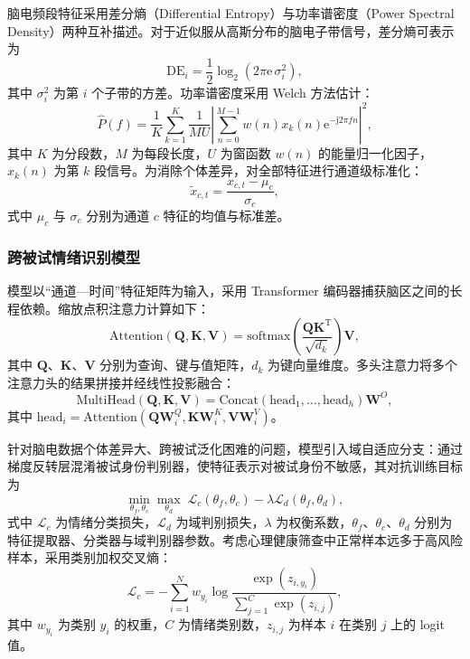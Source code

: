 \documentclass[zihao=-4,fontset=windows,a4paper]{ctexart}
\begin{document}
脑电频段特征采用差分熵（Differential Entropy）与功率谱密度（Power Spectral Density）两种互补描述。对于近似服从高斯分布的脑电子带信号，差分熵可表示为
\begin{equation}
\mathrm{DE}_i = \frac{1}{2}\log_2\left(2\pi \mathrm{e}\, \sigma_i^2\right),
\label{eq:de}
\end{equation}
其中 $\sigma_i^2$ 为第 $i$ 个子带的方差。功率谱密度采用 Welch 方法估计：
\begin{equation}
\hat{P}(f) = \frac{1}{K}\sum_{k=1}^{K}\frac{1}{M U}\left|\sum_{n=0}^{M-1}w(n)x_k(n)\mathrm{e}^{-\mathrm{j}2\pi f n}\right|^{2},
\label{eq:psd}
\end{equation}
其中 $K$ 为分段数，$M$ 为每段长度，$U$ 为窗函数 $w(n)$ 的能量归一化因子，$x_k(n)$ 为第 $k$ 段信号。为消除个体差异，对全部特征进行通道级标准化：
\begin{equation}
\tilde{x}_{c,t} = \frac{x_{c,t}-\mu_c}{\sigma_c},
\label{eq:zscore}
\end{equation}
式中 $\mu_c$ 与 $\sigma_c$ 分别为通道 $c$ 特征的均值与标准差。

\subsubsection{跨被试情绪识别模型}

模型以“通道—时间”特征矩阵为输入，采用 Transformer 编码器捕获脑区之间的长程依赖。缩放点积注意力计算如下：
\begin{equation}
\mathrm{Attention}(\bm{Q},\bm{K},\bm{V}) = \mathrm{softmax}\!\left(\frac{\bm{Q}\bm{K}^{\mathrm{T}}}{\sqrt{d_k}}\right)\bm{V},
\label{eq:attn}
\end{equation}
其中 $\bm{Q}$、$\bm{K}$、$\bm{V}$ 分别为查询、键与值矩阵，$d_k$ 为键向量维度。多头注意力将多个注意力头的结果拼接并经线性投影融合：
\begin{equation}
\mathrm{MultiHead}(\bm{Q},\bm{K},\bm{V}) = \mathrm{Concat}(\mathrm{head}_1,\ldots,\mathrm{head}_h)\bm{W}^{O},
\label{eq:mha}
\end{equation}
其中 $\mathrm{head}_i=\mathrm{Attention}(\bm{Q}\bm{W}_i^{Q},\bm{K}\bm{W}_i^{K},\bm{V}\bm{W}_i^{V})$。

针对脑电数据个体差异大、跨被试泛化困难的问题，模型引入域自适应分支：通过梯度反转层混淆被试身份判别器，使特征表示对被试身份不敏感，其对抗训练目标为
\begin{equation}
\min_{\theta_f,\theta_c}\max_{\theta_d}\; \mathcal{L}_c(\theta_f,\theta_c) - \lambda \mathcal{L}_d(\theta_f,\theta_d),
\label{eq:domain}
\end{equation}
式中 $\mathcal{L}_c$ 为情绪分类损失，$\mathcal{L}_d$ 为域判别损失，$\lambda$ 为权衡系数，$\theta_f$、$\theta_c$、$\theta_d$ 分别为特征提取器、分类器与域判别器参数。考虑心理健康筛查中正常样本远多于高风险样本，采用类别加权交叉熵：
\begin{equation}
\mathcal{L}_c = -\sum_{i=1}^{N} w_{y_i}\log\frac{\exp(z_{i,y_i})}{\sum_{j=1}^{C}\exp(z_{i,j})},
\label{eq:loss}
\end{equation}
其中 $w_{y_i}$ 为类别 $y_i$ 的权重，$C$ 为情绪类别数，$z_{i,j}$ 为样本 $i$ 在类别 $j$ 上的 logit 值。
\end{document}
